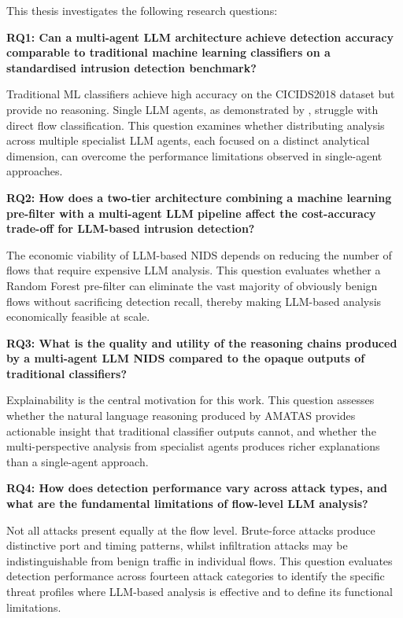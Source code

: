 \documentclass[../main.tex]{subfiles}
\begin{document}
This thesis investigates the following research questions:

\textbf{RQ1: Can a multi-agent LLM architecture achieve detection accuracy comparable to traditional machine learning classifiers on a standardised intrusion detection benchmark?}

Traditional ML classifiers achieve high accuracy on the CICIDS2018 dataset but provide no reasoning. Single LLM agents, as demonstrated by \textcite{Houssel2024}, struggle with direct flow classification. This question examines whether distributing analysis across multiple specialist LLM agents, each focused on a distinct analytical dimension, can overcome the performance limitations observed in single-agent approaches.

\textbf{RQ2: How does a two-tier architecture combining a machine learning pre-filter with a multi-agent LLM pipeline affect the cost-accuracy trade-off for LLM-based intrusion detection?}

The economic viability of LLM-based NIDS depends on reducing the number of flows that require expensive LLM analysis. This question evaluates whether a Random Forest pre-filter can eliminate the vast majority of obviously benign flows without sacrificing detection recall, thereby making LLM-based analysis economically feasible at scale.

\textbf{RQ3: What is the quality and utility of the reasoning chains produced by a multi-agent LLM NIDS compared to the opaque outputs of traditional classifiers?}

Explainability is the central motivation for this work. This question assesses whether the natural language reasoning produced by AMATAS provides actionable insight that traditional classifier outputs cannot, and whether the multi-perspective analysis from specialist agents produces richer explanations than a single-agent approach.

\textbf{RQ4: How does detection performance vary across attack types, and what are the fundamental limitations of flow-level LLM analysis?}

Not all attacks present equally at the flow level. Brute-force attacks produce distinctive port and timing patterns, whilst infiltration attacks may be indistinguishable from benign traffic in individual flows. This question evaluates detection performance across fourteen attack categories to identify the specific threat profiles where LLM-based analysis is effective and to define its functional limitations.
\end{document}
